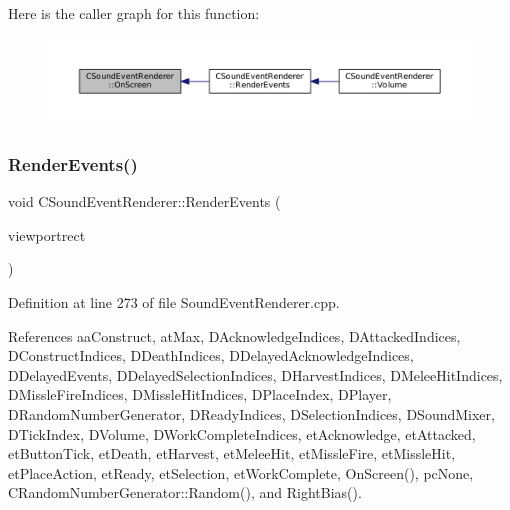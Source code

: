 Here is the caller graph for this function\+:\nopagebreak
\begin{figure}[H]
\begin{center}
\leavevmode
\includegraphics[width=350pt]{classCSoundEventRenderer_a9df97d476a3a39cb7126db9c366c2f0c_icgraph}
\end{center}
\end{figure}
\hypertarget{classCSoundEventRenderer_aa8b0c3029ea920ae4f4a08b9d9dd1c9c}{}\label{classCSoundEventRenderer_aa8b0c3029ea920ae4f4a08b9d9dd1c9c} 
\subsubsection{\texorpdfstring{Render\+Events()}{RenderEvents()}}
{\footnotesize\ttfamily void C\+Sound\+Event\+Renderer\+::\+Render\+Events (\begin{DoxyParamCaption}\item[{const \hyperlink{structSRectangle}{S\+Rectangle} \&}]{viewportrect }\end{DoxyParamCaption})}



Definition at line 273 of file Sound\+Event\+Renderer.\+cpp.



References aa\+Construct, at\+Max, D\+Acknowledge\+Indices, D\+Attacked\+Indices, D\+Construct\+Indices, D\+Death\+Indices, D\+Delayed\+Acknowledge\+Indices, D\+Delayed\+Events, D\+Delayed\+Selection\+Indices, D\+Harvest\+Indices, D\+Melee\+Hit\+Indices, D\+Missle\+Fire\+Indices, D\+Missle\+Hit\+Indices, D\+Place\+Index, D\+Player, D\+Random\+Number\+Generator, D\+Ready\+Indices, D\+Selection\+Indices, D\+Sound\+Mixer, D\+Tick\+Index, D\+Volume, D\+Work\+Complete\+Indices, et\+Acknowledge, et\+Attacked, et\+Button\+Tick, et\+Death, et\+Harvest, et\+Melee\+Hit, et\+Missle\+Fire, et\+Missle\+Hit, et\+Place\+Action, et\+Ready, et\+Selection, et\+Work\+Complete, On\+Screen(), pc\+None, C\+Random\+Number\+Generator\+::\+Random(), and Right\+Bias().




